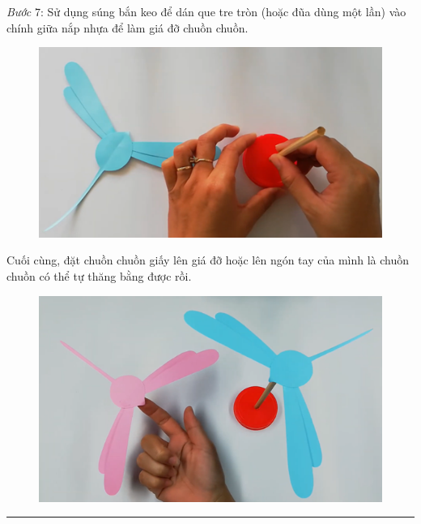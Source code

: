 \begin{multicols}{2}
\begin{figure}[H]
		\vspace*{-10pt}
	\end{figure}
	\textit{Bước} $7$: Sử dụng súng bắn keo để dán que tre tròn (hoặc đũa dùng một lần) vào chính giữa nắp nhựa để làm giá đỡ chuồn chuồn.
	\begin{figure}[H]
		\vspace*{-5pt}
		\centering
		\captionsetup{labelformat= empty, justification=centering}
		\includegraphics[width=0.7\linewidth]{74}
		\vspace*{-10pt}
	\end{figure}
	Cuối cùng, đặt chuồn chuồn giấy lên giá đỡ hoặc lên ngón tay của mình là chuồn chuồn có thể tự thăng bằng được rồi.
	\begin{figure}[H]
		\vspace*{-5pt}
		\centering
		\captionsetup{labelformat= empty, justification=centering}
		\includegraphics[width=0.7\linewidth]{75}
		\vspace*{-10pt}
	\end{figure}
\end{multicols}
{\color{toancuabi}\rule{1\linewidth}{0.1pt}}
\graphicspath{{../toancuabi/pic/}}
\begingroup

